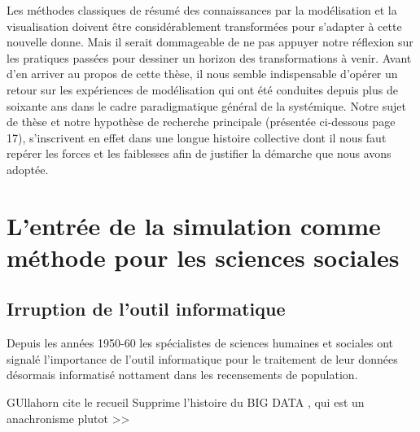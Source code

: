 Les méthodes classiques de résumé des connaissances par la modélisation et la visualisation doivent être considérablement transformées pour s’adapter à cette nouvelle donne. Mais il serait dommageable de ne pas appuyer notre réflexion sur les pratiques passées pour dessiner un horizon des transformations à venir. Avant d’en arriver au propos de cette thèse, il nous semble indispensable d’opérer un retour sur les expériences de modélisation qui ont été conduites depuis plus de soixante ans dans le cadre paradigmatique général de la systémique. Notre sujet de thèse et notre hypothèse de recherche principale (présentée ci-dessous page 17), s’inscrivent en effet dans une longue histoire collective dont il nous faut repérer les forces et les faiblesses afin de justifier la démarche que nous avons adoptée. 

\section{L'entrée de la simulation comme méthode pour les sciences sociales}

\subsection{Irruption de l'outil informatique }
\label{sec:apparition_outil_informatique}

Depuis les années 1950-60 les spécialistes de sciences humaines et sociales ont signalé l'importance de l'outil informatique pour le traitement de leur données désormais informatisé nottament dans les recensements de population.

GUllahorn cite le recueil 
Supprime l'histoire du BIG DATA , qui est un anachronisme plutot >> 

